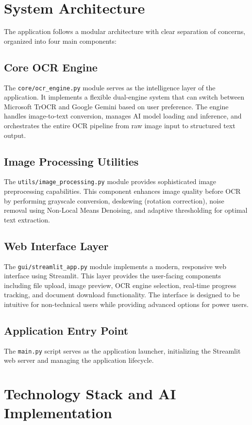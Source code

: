 \documentclass[12pt,a4paper]{article}
\begin{document}
\section{System Architecture}

The application follows a modular architecture with clear separation of concerns, organized into four main components:

\subsection{Core OCR Engine}
The \texttt{core/ocr\_engine.py} module serves as the intelligence layer of the application. It implements a flexible dual-engine system that can switch between Microsoft TrOCR and Google Gemini based on user preference. The engine handles image-to-text conversion, manages AI model loading and inference, and orchestrates the entire OCR pipeline from raw image input to structured text output.

\subsection{Image Processing Utilities}
The \texttt{utils/image\_processing.py} module provides sophisticated image preprocessing capabilities. This component enhances image quality before OCR by performing grayscale conversion, deskewing (rotation correction), noise removal using Non-Local Means Denoising, and adaptive thresholding for optimal text extraction.

\subsection{Web Interface Layer}
The \texttt{gui/streamlit\_app.py} module implements a modern, responsive web interface using Streamlit. This layer provides the user-facing components including file upload, image preview, OCR engine selection, real-time progress tracking, and document download functionality. The interface is designed to be intuitive for non-technical users while providing advanced options for power users.

\subsection{Application Entry Point}
The \texttt{main.py} script serves as the application launcher, initializing the Streamlit web server and managing the application lifecycle.

\section{Technology Stack and AI Implementation}
\end{document}
